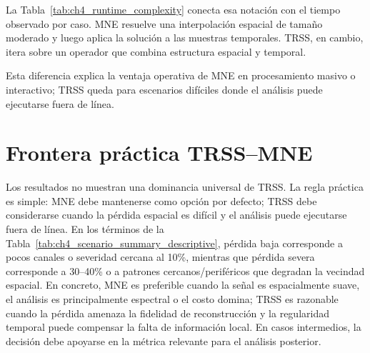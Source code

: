 La Tabla~\ref{tab:ch4_runtime_complexity} conecta esa notación con el tiempo observado por caso. MNE resuelve una interpolación espacial de tamaño moderado y luego aplica la solución a las muestras temporales. TRSS, en cambio, itera sobre un operador que combina estructura espacial y temporal.



Esta diferencia explica la ventaja operativa de MNE en procesamiento masivo o interactivo; TRSS queda para escenarios difíciles donde el análisis puede ejecutarse fuera de línea.

\FloatBarrier

\section{Frontera práctica TRSS--MNE}

Los resultados no muestran una dominancia universal de TRSS. La regla práctica es simple: MNE debe mantenerse como opción por defecto; TRSS debe considerarse cuando la pérdida espacial es difícil y el análisis puede ejecutarse fuera de línea. En los términos de la Tabla~\ref{tab:ch4_scenario_summary_descriptive}, pérdida baja corresponde a pocos canales o severidad cercana al 10\%, mientras que pérdida severa corresponde a 30--40\% o a patrones cercanos/periféricos que degradan la vecindad espacial. En concreto, MNE es preferible cuando la señal es espacialmente suave, el análisis es principalmente espectral o el costo domina; TRSS es razonable cuando la pérdida amenaza la fidelidad de reconstrucción y la regularidad temporal puede compensar la falta de información local. En casos intermedios, la decisión debe apoyarse en la métrica relevante para el análisis posterior.
